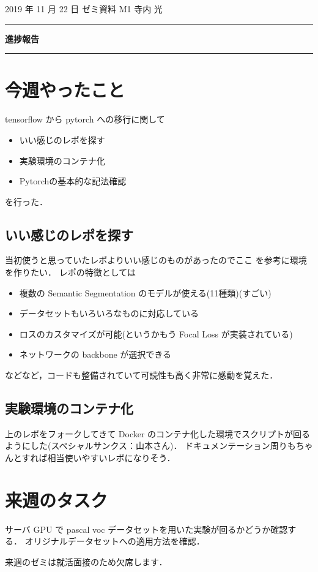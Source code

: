 \documentclass[onecolumn]{ujarticle}   %
\begin{document}
	\noindent

	\hspace{1em}
	2019 年 11 月 22 日
	ゼミ資料
	\hfill
	M1 寺内 光

	\vspace{2mm}

	\hrule

	\begin{center}
		{\Large \bf 進捗報告}
	\end{center}


	\hrule
	\vspace{3mm}

	\section{今週やったこと}
	tensorflow から pytorch への移行に関して
	\begin{itemize}
		\item{いい感じのレポを探す}
		\item{実験環境のコンテナ化}
		\item{Pytorchの基本的な記法確認}
	\end{itemize}
	を行った．

	\subsection{いい感じのレポを探す}
	当初使うと思っていたレポよりいい感じのものがあったのでここ \cite{pytorch_segmentation} を参考に環境を作りたい．
	レポの特徴としては
	\begin{itemize}
		\item{複数の Semantic Segmentation のモデルが使える(11種類)(すごい)}
		\item{データセットもいろいろなものに対応している}
		\item{ロスのカスタマイズが可能(というかもう Focal Loss が実装されている)}
		\item{ネットワークの backbone が選択できる}
	\end{itemize}
	などなど，コードも整備されていて可読性も高く非常に感動を覚えた．

	\subsection{実験環境のコンテナ化}
	上のレポをフォークしてきて Docker のコンテナ化した環境でスクリプトが回るようにした(スペシャルサンクス：山本さん)．
	ドキュメンテーション周りもちゃんとすれば相当使いやすいレポになりそう．

	\section{来週のタスク}
	サーバ GPU で pascal voc データセットを用いた実験が回るかどうか確認する．
	オリジナルデータセットへの適用方法を確認．

	来週のゼミは就活面接のため欠席します．

	
	
\end{document}
